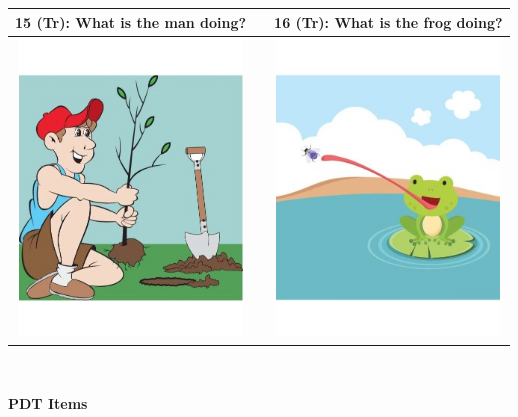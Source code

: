 \documentclass[12pt,notitlepage]{article}
\begin{document}
\begin{center}
\begin{tabular}{|c|c|c|}
\hline
15 (Tr): What is the man doing? && 16 (Tr): What is the frog doing? \\
\hline
\includegraphics[width=16em,trim=0 0 0 -3]{figures/I15.jpg} & & \includegraphics[width=16em,trim=0 0 0 -3]{figures/I16.jpg} \\
\hline
\end{tabular}
\vspace{1em} \\


\clearpage

{\Large \textbf{PDT Items}}

\vspace{2em}


\end{center}
\end{document}
